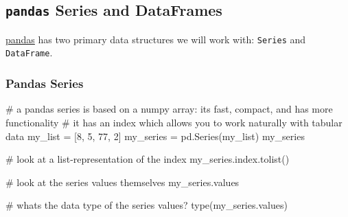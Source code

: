 \documentclass[
  letterpaper,
  DIV=11,
  numbers=noendperiod]{scrreprt}
\newenvironment{Shaded}{\begin{snugshade}}{\end{snugshade}}
\newcommand{\BuiltInTok}[1]{\textcolor[rgb]{0.00,0.23,0.31}{#1}}
\newcommand{\CommentTok}[1]{\textcolor[rgb]{0.37,0.37,0.37}{#1}}
\newcommand{\DecValTok}[1]{\textcolor[rgb]{0.68,0.00,0.00}{#1}}
\newcommand{\NormalTok}[1]{\textcolor[rgb]{0.00,0.23,0.31}{#1}}
\newcommand{\OperatorTok}[1]{\textcolor[rgb]{0.37,0.37,0.37}{#1}}
\begin{document}
\hypertarget{pandas-series-and-dataframes}{%
\subsection{\texorpdfstring{\texttt{pandas} Series and
DataFrames}{pandas Series and DataFrames}}\label{pandas-series-and-dataframes}}

\href{https://pandas.pydata.org/}{pandas} has two primary data
structures we will work with: \texttt{Series} and \texttt{DataFrame}.

\hypertarget{pandas-series}{%
\subsubsection{Pandas Series}\label{pandas-series}}

\begin{Shaded}
\begin{Highlighting}[]
\CommentTok{\# a pandas series is based on a numpy array: it\textquotesingle{}s fast, compact, and has more functionality}
\CommentTok{\# it has an index which allows you to work naturally with tabular data}
\NormalTok{my\_list }\OperatorTok{=}\NormalTok{ [}\DecValTok{8}\NormalTok{, }\DecValTok{5}\NormalTok{, }\DecValTok{77}\NormalTok{, }\DecValTok{2}\NormalTok{]}
\NormalTok{my\_series }\OperatorTok{=}\NormalTok{ pd.Series(my\_list)}
\NormalTok{my\_series}
\end{Highlighting}
\end{Shaded}

\begin{Shaded}
\begin{Highlighting}[]
\CommentTok{\# look at a list{-}representation of the index}
\NormalTok{my\_series.index.tolist()}
\end{Highlighting}
\end{Shaded}

\begin{Shaded}
\begin{Highlighting}[]
\CommentTok{\# look at the series\textquotesingle{} values themselves}
\NormalTok{my\_series.values}
\end{Highlighting}
\end{Shaded}

\begin{Shaded}
\begin{Highlighting}[]
\CommentTok{\# what\textquotesingle{}s the data type of the series\textquotesingle{} values?}
\BuiltInTok{type}\NormalTok{(my\_series.values)}
\end{Highlighting}
\end{Shaded}
\end{document}
